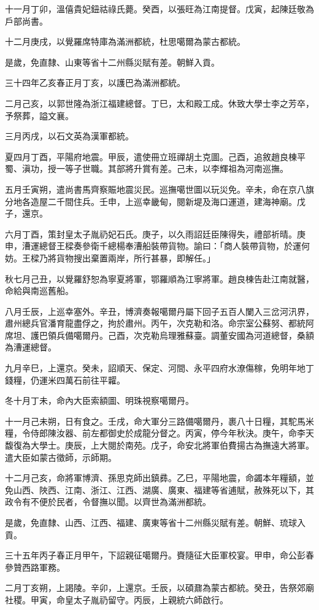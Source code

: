\begin{pinyinscope}
十一月丁卯，溫僖貴妃鈕祜祿氏薨。癸酉，以張旺為江南提督。戊寅，起陳廷敬為戶部尚書。

十二月庚戌，以覺羅席特庫為滿洲都統，杜思噶爾為蒙古都統。

是歲，免直隸、山東等省十二州縣災賦有差。朝鮮入貢。

三十四年乙亥春正月丁亥，以護巴為滿洲都統。

二月己亥，以郭世隆為浙江福建總督。丁巳，太和殿工成。休致大學士李之芳卒，予祭葬，謚文襄。

三月丙戌，以石文英為漢軍都統。

夏四月丁酉，平陽府地震。甲辰，遣使冊立班禪胡土克圖。己酉，追敘趙良棟平蜀、滇功，授一等子世職。其部將升賞有差。己未，以李輝祖為河南巡撫。

五月壬寅朔，遣尚書馬齊察賑地震災民。巡撫噶世圖以玩災免。辛未，命在京八旗分地各造屋二千間住兵。壬申，上巡幸畿甸，閱新堤及海口運道，建海神廟。戊子，還京。

六月丁酉，策封皇太子胤礽妃石氏。庚子，以久雨詔廷臣陳得失，禮部祈晴。庚申，漕運總督王樑奏參衛千總楊奉漕船裝帶貨物。諭曰：「商人裝帶貨物，於運何妨。王樑乃將貨物搜出棄置兩岸，所行甚暴，即解任。」

秋七月己丑，以覺羅舒恕為寧夏將軍，鄂羅順為江寧將軍。趙良棟告赴江南就醫，命給與南巡舊船。

八月壬辰，上巡幸塞外。辛丑，博濟奏報噶爾丹屬下回子五百人闌入三岔河汛界，肅州總兵官潘育龍盡俘之，拘於肅州。丙午，次克勒和洛。命宗室公蘇努、都統阿席坦、護巴領兵備噶爾丹。己酉，次克勒烏理雅蘇臺。調董安國為河道總督，桑額為漕運總督。

九月辛巳，上還京。癸未，詔順天、保定、河間、永平四府水潦傷稼，免明年地丁錢糧，仍運米四萬石前往平糶。

冬十月丁未，命內大臣索額圖、明珠視察噶爾丹。

十一月己未朔，日有食之。壬戌，命大軍分三路備噶爾丹，裹八十日糧，其駝馬米糧，令侍郎陳汝器、前左都御史於成龍分督之。丙寅，停今年秋決。庚午，命李天馥復為大學士。庚辰，上大閱於南苑。戊子，命安北將軍伯費揚古為撫遠大將軍。遣大臣如蒙古徵師，示師期。

十二月己亥，命將軍博濟、孫思克師出鎮彞。乙巳，平陽地震，命蠲本年糧額，並免山西、陜西、江南、浙江、江西、湖廣、廣東、福建等省逋賦，赦殊死以下，其政令有不便於民者，令督撫以聞。以齊世為滿洲都統。

是歲，免直隸、山西、江西、福建、廣東等省十二州縣災賦有差。朝鮮、琉球入貢。

三十五年丙子春正月甲午，下詔親征噶爾丹。賚隨征大臣軍校宴。甲申，命公彭春參贊西路軍務。

二月丁亥朔，上謁陵。辛卯，上還京。壬辰，以碩鼐為蒙古都統。癸丑，告祭郊廟社稷。甲寅，命皇太子胤礽留守。丙辰，上親統六師啟行。


\end{pinyinscope}
